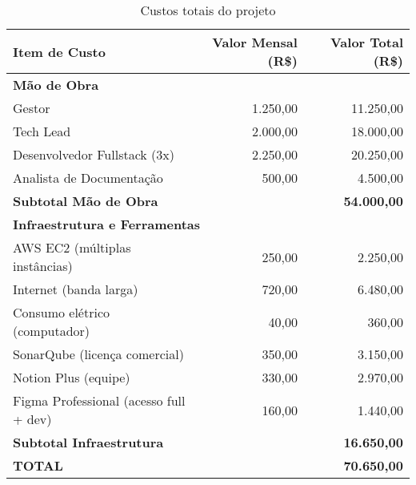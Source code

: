 \begin{table}[htbp]
	\centering
	\caption{Custos totais do projeto}
	\label{tab:custo-total-projeto}
	\begin{tabular}{lrr}
		\toprule
		\textbf{Item de Custo} & \textbf{Valor Mensal (R\$)} & \textbf{Valor Total (R\$)} \\
		\midrule
		\multicolumn{3}{l}{\textbf{Mão de Obra}} \\
		\quad Gestor & 1.250,00 & 11.250,00 \\
		\quad Tech Lead & 2.000,00 & 18.000,00 \\
		\quad Desenvolvedor Fullstack (3x) & 2.250,00 & 20.250,00 \\
		\quad Analista de Documentação & 500,00 & 4.500,00 \\
		\cmidrule{3-3}
		\multicolumn{2}{l}{\textbf{Subtotal Mão de Obra}} & \textbf{54.000,00} \\
		\midrule
		\multicolumn{3}{l}{\textbf{Infraestrutura e Ferramentas}} \\
		\quad AWS EC2 (múltiplas instâncias) & 250,00 & 2.250,00 \\
		\quad Internet (banda larga) & 720,00 & 6.480,00 \\
		\quad Consumo elétrico (computador) & 40,00 & 360,00 \\
		\quad SonarQube (licença comercial) & 350,00 & 3.150,00 \\
		\quad Notion Plus (equipe) & 330,00 & 2.970,00 \\
		\quad Figma Professional (acesso full + dev) & 160,00 & 1.440,00 \\
		\cmidrule{3-3}
		\multicolumn{2}{l}{\textbf{Subtotal Infraestrutura}} & \textbf{16.650,00} \\
		\midrule
		\multicolumn{2}{l}{\textbf{TOTAL}} & \textbf{70.650,00} \\
		\bottomrule
	\end{tabular}
\end{table}